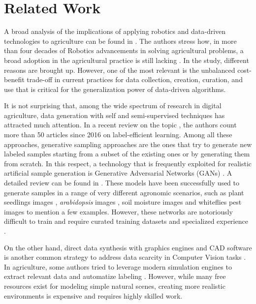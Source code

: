 \section{Related Work}
\label{sec::related}
A broad analysis of the implications of applying robotics and data-driven technologies to agriculture can be found in \cite{roscher2023data}. The authors stress how, in more than four decades of Robotics advancements in solving agricultural problems, a broad adoption in the agricultural practice is still lacking \cite{kamilaris2017review}. In the study, different reasons are brought up. However, one of the most relevant is the unbalanced cost-benefit trade-off in current practices for data collection, creation, curation, and use that is critical for the generalization power of data-driven algorithms. 

It is not surprising that, among the wide spectrum of research in digital agriculture, data generation with self and semi-supervised techniques has attracted much attention. In a recent review on the topic \cite{li2023label}, the authors count more than 50 articles since 2016 on label-efficient learning. Among all these approaches, generative sampling approaches are the ones that try to generate new labeled samples starting from a subset of the existing ones or by generating them from scratch. In this respect, a technology that is frequently exploited for realistic artificial sample generation is Generative Adversarial Networks (GANs) \cite{goodfellow2020generative}. A detailed review can be found in \cite{lu2022generative}. These models have been successfully used to generate samples in a range of very different agronomic scenarios, such as plant seedlings images \cite{madsen2019generating}, \textit{arabidopsis} images \cite{valerio2017arigan}, soil moisture images \cite{hammouch2022ganset} and whiteflies pest images \cite{karam2022gan-based} to mention a few examples. However, these networks are notoriously difficult to train and require curated training datasets and specialized experience \cite{lu2022generative}. 

On the other hand, direct data synthesis with graphics engines and CAD software is another common strategy to address data scarcity in Computer Vision tasks \cite{paulin2023review}. In agriculture, some authors tried to leverage modern simulation engines to extract relevant data and automatize labeling \cite{barth2018data}. However, while many free resources exist for modeling simple natural scenes, creating more realistic environments is expensive and requires highly skilled work. 

